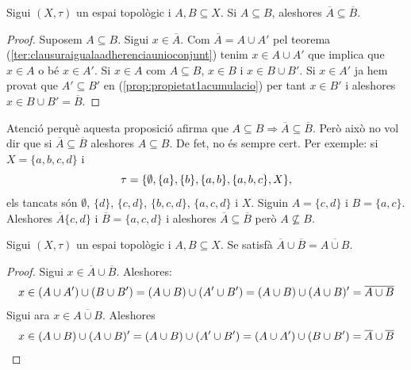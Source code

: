 \documentclass[../main.tex]{subfiles}
\begin{document}
\begin{prop}
\label{prop:propietat1clausura} Sigui $(X,\tau)$ un espai topològic i $A,B\subseteq X$. Si $A\subseteq B$, aleshores $\overline{A}\subseteq \overline{B}$.
\end{prop}
\begin{proof}
Suposem $A\subseteq B$. Sigui $x\in\overline{A}$. Com $\overline{A} = A\cup A'$ pel teorema (\ref{ter:clausuraigualaadherenciaunioconjunt}) tenim $x\in A\cup A'$ que implica que $x\in A$ o bé $x\in A'$. Si $x\in A$ com $A\subseteq B$, $x\in B$ i $x\in B\cup B'$. Si $x\in A'$ ja hem provat que $A'\subseteq B'$ en (\ref{prop:propietat1acumulacio}) per tant $x\in B'$ i aleshores $x\in B\cup B' = \overline{B}$.
\end{proof}

Atenció perquè aquesta proposició afirma que $A\subseteq B\Rightarrow \overline{A}\subseteq \overline{B}$. Però això no vol dir que si $\overline{A}\subseteq \overline{B}$ aleshores $A\subseteq B$. De fet, no és sempre cert. Per exemple: si $X = \{a,b,c,d\}$ i 
\begin{equation}
    \notag
    \tau = \{\emptyset,\{a\},\{b\},\{a,b\},\{a,b,c\},X\},
\end{equation}
els tancats són $\emptyset$, $\{d\}$, $\{c,d\}$, $\{b,c,d\}$, $\{a,c,d\}$ i $X$. Siguin $A = \{c,d\}$ i $B=\{a,c\}$. Aleshores $\overline{A} \{c,d\}$ i $\overline{B} = \{a,c,d\}$ i aleshores $\overline{A}\subseteq \overline{B}$ però $A\not\subseteq B$.

\begin{prop}
\label{prop:propietat2clausura} Sigui $(X,\tau)$ un espai topològic i $A,B\subseteq X$. Se satisfà $\overline{A}\cup\overline{B}=\overline{A\cup B}$.
\end{prop}
\begin{proof}
Sigui $x\in\overline{A}\cup \overline{B}$. Aleshores:
\begin{equation}
    \notag
    x\in (A\cup A')\cup (B\cup B') = (A\cup B)\cup (A'\cup B') = (A\cup B)\cup (A\cup B)' = \overline{A\cup B}
\end{equation}
Sigui ara $x\in\overline{A\cup B}$. Aleshores
\begin{equation}
    \notag
    x\in (A\cup B)\cup(A\cup B)' = (A\cup B)\cup (A'\cup B') = (A\cup A')\cup (B\cup B') = \overline{A}\cup \overline{B}
\end{equation}
\end{proof}
\end{document}
